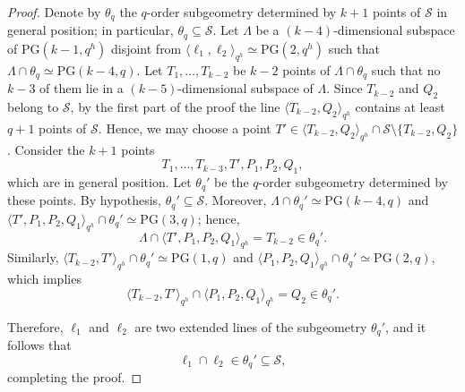 \documentclass[11pt]{article}
\theoremstyle{definition}
\numberwithin{equation}{section}
\def\PG{\mathrm{PG}}
\begin{document}
\begin{proof}
\noindent Denote by $\theta_q$ the $q$-order subgeometry determined by $k+1$ points of 
$\mathcal S$ in general position; in particular, $\theta_q \subseteq \mathcal S$. 
Let $\Lambda$ be a $(k-4)$-dimensional subspace of $\PG(k-1,q^h)$ disjoint from 
$\langle \ell_1,\ell_2 \rangle_{q^h} \simeq \PG(2,q^h)$ such that 
$\Lambda \cap \theta_q \simeq \PG(k-4,q)$. Let $T_1,\dots,T_{k-2}$ be $k-2$ points 
of $\Lambda \cap \theta_q$ such that no $k-3$ of them lie in a $(k-5)$-dimensional subspace of 
$\Lambda$. Since $T_{k-2}$ and $Q_2$ belong to $\mathcal S$, by the first part of the proof 
the line $\langle T_{k-2},Q_2 \rangle_{q^h}$ contains at least $q+1$ points of 
$\mathcal S$. Hence, we may choose a point 
$T' \in \langle T_{k-2},Q_2 \rangle_{q^h} \cap \mathcal S \setminus 
\{T_{k-2},Q_2\}$. Consider the $k+1$ points
\[
T_1,\dots,T_{k-3},T',P_1,P_2,Q_1,
\]
which are in general position. Let $\theta_q'$ be the $q$-order subgeometry 
determined by these points. By hypothesis, $\theta_q' \subseteq \mathcal S$. Moreover, $\Lambda \cap \theta_q' \simeq \PG(k-4,q)$ and 
$\langle T',P_1,P_2,Q_1 \rangle_{q^h} \cap \theta_q' \simeq \PG(3,q)$; hence,
\[
\Lambda \cap \langle T',P_1,P_2,Q_1 \rangle_{q^h} = T_{k-2} \in \theta_q'.
\]
Similarly, 
$\langle T_{k-2},T' \rangle_{q^h} \cap \theta_q' \simeq \PG(1,q)$ and 
$\langle P_1,P_2,Q_1 \rangle_{q^h} \cap \theta_q' \simeq \PG(2,q)$, which implies
\[
\langle T_{k-2},T' \rangle_{q^h} \cap 
\langle P_1,P_2,Q_1 \rangle_{q^h} = Q_2 \in \theta_q'.
\]

\noindent Therefore, $\ell_1$ and $\ell_2$ are two extended lines of the subgeometry 
$\theta_q'$, and it follows that \[\ell_1 \cap \ell_2 \in \theta_q' \subseteq 
\mathcal S,\] completing the proof.
\end{proof}
\end{document}
